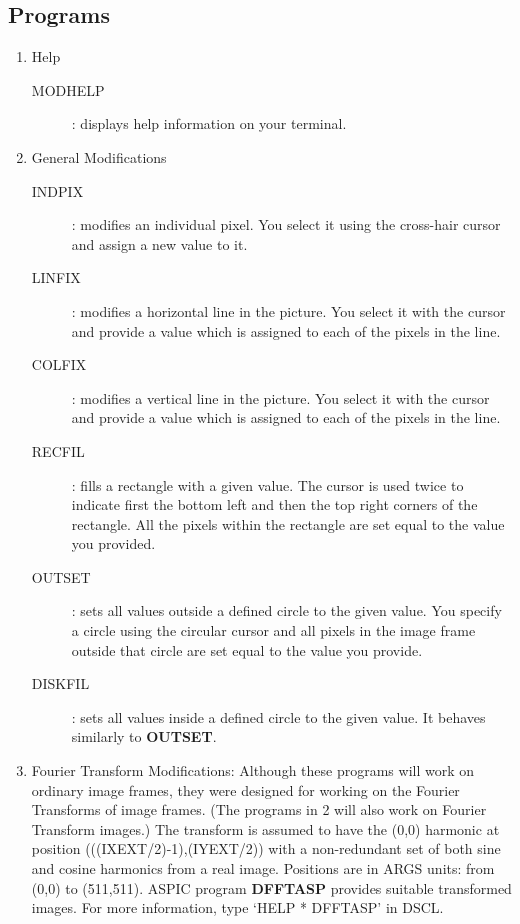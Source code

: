 \subsection {Programs}
\begin{enumerate}
\item Help
\begin{description}
\item [MODHELP]:
displays help information on your terminal.
\end{description}
\item General Modifications
\begin{description}
\item [INDPIX]:
modifies an individual pixel.
You select it using the cross-hair cursor and assign a new value to it.
\item [LINFIX]:
modifies a horizontal line in the picture.
You select it with the cursor and provide a value which is assigned to each of
the pixels in the line.
\item [COLFIX]:
modifies a vertical line in the picture.
You select it with the cursor and provide a value which is assigned to each of
the pixels in the line.
\item [RECFIL]:
fills a rectangle with a given value.
The cursor is used twice to indicate first the bottom left and then the top
right corners of the rectangle.
All the pixels within the rectangle are set equal to the value you provided.
\item [OUTSET]:
sets all values outside a defined circle to the given value.
You specify a circle using the circular cursor and all pixels in the image frame
outside that circle are set equal to the value you provide.
\item [DISKFIL]:
sets all values inside a defined circle to the given value.
It behaves similarly to {\bf OUTSET}.
\end{description}
\item Fourier Transform Modifications:
Although these programs will work on ordinary image frames, they
were designed for working on the Fourier Transforms of image frames.
(The programs in 2 will also work on Fourier Transform images.)
The transform is assumed to have the (0,0) harmonic at position
(((IXEXT/2)-1),(IYEXT/2)) with a non-redundant set of both sine and cosine
harmonics from a real image.
Positions are in ARGS units: from (0,0) to (511,511).
ASPIC program {\bf DFFTASP} provides suitable transformed images.
For more information, type `HELP * DFFTASP' in DSCL.
\begin{description}

\end{description}
\end{enumerate}
